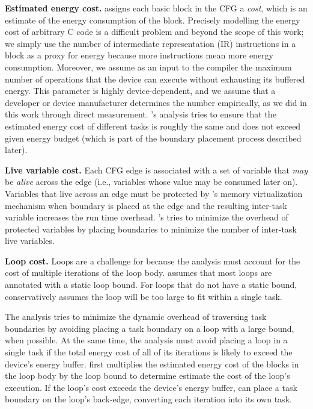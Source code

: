 {\noindent \bf Estimated energy cost.} \sys assigns each basic block in the CFG a {\em cost}, which is an estimate of the energy consumption of the block. Precisely modelling the energy cost of arbitrary C code is a difficult problem and beyond the scope of this work; we simply use the number of intermediate representation (IR) instructions in a block as a proxy for energy because more instructions mean more energy consumption. Moreover, we assume as an input to the compiler the maximum number of operations that the device can execute without exhausting its buffered energy. This parameter is highly device-dependent, and we assume that a developer or device manufacturer determines the number empirically, as we did in this work through direct measurement. \sys's analysis tries to ensure that the estimated energy cost of different tasks is roughly the same and does not exceed given energy budget (which is part of the boundary placement process described later).

{\noindent \bf Live variable cost.} Each CFG edge is associated with a set of variable that {\em may} be {\em alive} across the edge (i.e., variables whose value may be consumed later on). Variables that live across an edge must be protected by \sys's memory virtualization mechanism when boundary is placed at the edge and the resulting inter-task variable increases the run time overhead. \sys's tries to minimize the overhead of protected variables by placing boundaries to minimize the number of inter-task live variables.

{\noindent \bf Loop cost.} Loops are a challenge for \sys because the analysis must account for the cost of multiple iterations of the loop body. \sys assumes that most loops are
annotated with a static loop bound. For loops that do not have a static bound, \sys conservatively assumes the loop will be too large to fit within a single task.


The analysis tries to minimize the dynamic overhead of traversing task boundaries by avoiding placing a task boundary on a loop with a large bound, when possible. At the same time, the analysis must avoid placing a loop in a single task if the total energy cost of all of its iterations is likely to exceed the device's energy buffer. \sys first multiplies the estimated energy cost of the blocks in the loop body by the loop bound to determine estimate the cost of the loop's execution. If the loop's cost exceeds the device's energy buffer, \sys can place a task boundary on the loop's back-edge, converting each iteration into its own task.  

